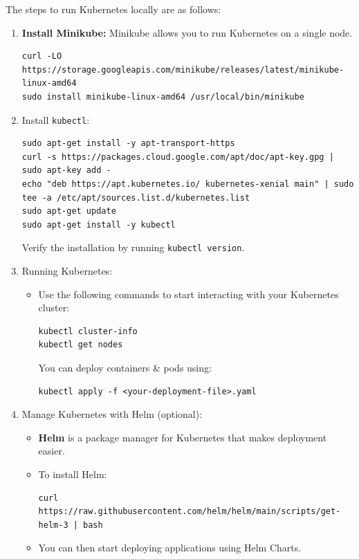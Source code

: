 \documentclass[a4paper,11pt]{article}
\begin{document}
The steps to run Kubernetes locally are as follows:
\begin{enumerate}
    \item   \textbf{Install Minikube:} Minikube allows you to run Kubernetes on a single node.
            \begin{verbatim}
curl -LO https://storage.googleapis.com/minikube/releases/latest/minikube-linux-amd64
sudo install minikube-linux-amd64 /usr/local/bin/minikube
\end{verbatim}
    \item   Install \verb|kubectl|:
            \begin{verbatim}
sudo apt-get install -y apt-transport-https
curl -s https://packages.cloud.google.com/apt/doc/apt-key.gpg | sudo apt-key add -
echo "deb https://apt.kubernetes.io/ kubernetes-xenial main" | sudo tee -a /etc/apt/sources.list.d/kubernetes.list
sudo apt-get update
sudo apt-get install -y kubectl
            \end{verbatim}
            Verify the installation by running \texttt{kubectl version}.
    \item   Running Kubernetes:
            \begin{itemize}
                \item   Use the following commands to start interacting with your Kubernetes cluster:
                \begin{verbatim}
kubectl cluster-info
kubectl get nodes
                \end{verbatim}
                You can deploy containers \& pods using:
                \begin{verbatim}
kubectl apply -f <your-deployment-file>.yaml
                \end{verbatim}
            \end{itemize}
    \item   Manage Kubernetes with Helm (optional):
            \begin{itemize}
                \item   \textbf{Helm} is a package manager for Kubernetes that makes deployment easier.
                \item   To install Helm:
                        \begin{verbatim}
curl https://raw.githubusercontent.com/helm/helm/main/scripts/get-helm-3 | bash
                        \end{verbatim}
                \item   You can then start deploying applications using Helm Charts.
            \end{itemize}
\end{enumerate}
\end{document}
